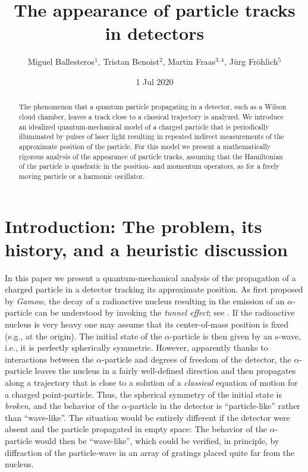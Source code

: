 \documentclass[12pt]{article}
\author{Miguel Ballesteros$^1$, Tristan Benoist$^2$, Martin Fraas$^{3,4}$, J\"urg Fr\"ohlich$^5$}
\title{The appearance of particle tracks in detectors}
\date{1 Jul 2020}
\begin{document}
\maketitle


\vspace{1em}

\begin{abstract}
The phenomenon that a quantum particle propagating in a detector, such as a 
Wilson cloud chamber, leaves a track close to a classical trajectory is analyzed. We introduce an idealized quantum-mechanical model of a charged particle that is periodically illuminated by pulses of laser light resulting in repeated indirect
measurements of the approximate position of the particle. For this model we present a mathematically rigorous analysis 
of the appearance of particle tracks, assuming that the Hamiltonian of the particle is quadratic in the position- and 
momentum operators, as for a freely moving particle or a harmonic oscillator.
\end{abstract}

\section{Introduction: The problem, its history, and a heuristic discussion}\label{Intro}
In this paper we present a quantum-mechanical analysis of the propagation of a charged particle in a detector tracking its approximate position. As first proposed by \textit{Gamow}, the decay of a radioactive nucleus resulting in the emission of an 
$\alpha$-particle can be understood by invoking the \textit{tunnel effect}; see \cite{Gamow}. If the radioactive nucleus 
is very heavy one may assume that its center-of-mass position is fixed (e.g., at the origin). The initial state of the 
$\alpha$-particle is then given by an s-wave, i.e., it is perfectly spherically symmetric. However, apparently 
thanks to interactions between the $\alpha$-particle and degrees of freedom of the detector, the $\alpha$-particle 
leaves the nucleus in a fairly well-defined direction and then propagates along a trajectory 
that is close to a solution of a \textit{classical} equation of motion for a charged point-particle. 
Thus, the spherical symmetry of the initial state is \textit{broken}, and the behavior of the $\alpha$-particle in the detector is ``particle-like'' rather than ``wave-like''. The situation would be entirely different if the detector were absent and the particle propagated in empty space: The behavior of the $\alpha$-particle would then be ``wave-like'', which could be verified, in principle, by diffraction of the 
particle-wave in an array of gratings placed quite far from the nucleus.
\end{document}
